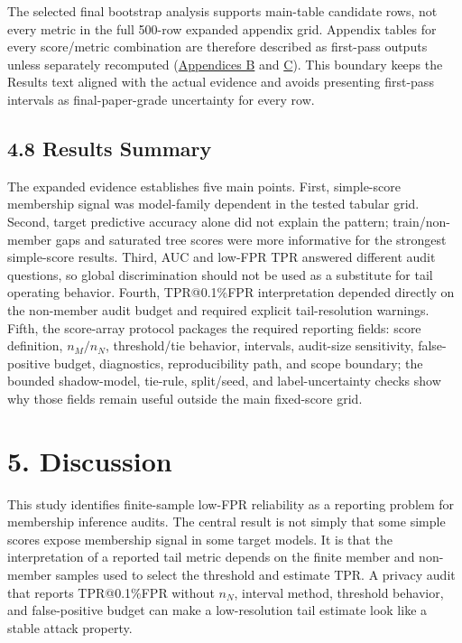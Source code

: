 \documentclass[
  10pt,
  twocolumn]{article}
\begin{document}
The selected final bootstrap analysis supports main-table candidate rows, not every metric in the full 500-row expanded appendix grid. Appendix tables for every score/metric combination are therefore described as first-pass outputs unless separately recomputed (\protect\hyperlink{appendix-b-supplementary-output-index}{Appendices B} and \protect\hyperlink{appendix-c-final-bootstrap-boundary}{C}). This boundary keeps the Results text aligned with the actual evidence and avoids presenting first-pass intervals as final-paper-grade uncertainty for every row.

\hypertarget{results-summary}{%
\subsection{4.8 Results Summary}\label{results-summary}}

The expanded evidence establishes five main points. First, simple-score membership signal was model-family dependent in the tested tabular grid. Second, target predictive accuracy alone did not explain the pattern; train/non-member gaps and saturated tree scores were more informative for the strongest simple-score results. Third, AUC and low-FPR TPR answered different audit questions, so global discrimination should not be used as a substitute for tail operating behavior. Fourth, TPR@0.1\%FPR interpretation depended directly on the non-member audit budget and required explicit tail-resolution warnings. Fifth, the score-array protocol packages the required reporting fields: score definition, \(n_M/n_N\), threshold/tie behavior, intervals, audit-size sensitivity, false-positive budget, diagnostics, reproducibility path, and scope boundary; the bounded shadow-model, tie-rule, split/seed, and label-uncertainty checks show why those fields remain useful outside the main fixed-score grid.

\hypertarget{discussion}{%
\section{5. Discussion}\label{discussion}}

This study identifies finite-sample low-FPR reliability as a reporting problem for membership inference audits. The central result is not simply that some simple scores expose membership signal in some target models. It is that the interpretation of a reported tail metric depends on the finite member and non-member samples used to select the threshold and estimate TPR. A privacy audit that reports TPR@0.1\%FPR without \(n_N\), interval method, threshold behavior, and false-positive budget can make a low-resolution tail estimate look like a stable attack property.
\end{document}
